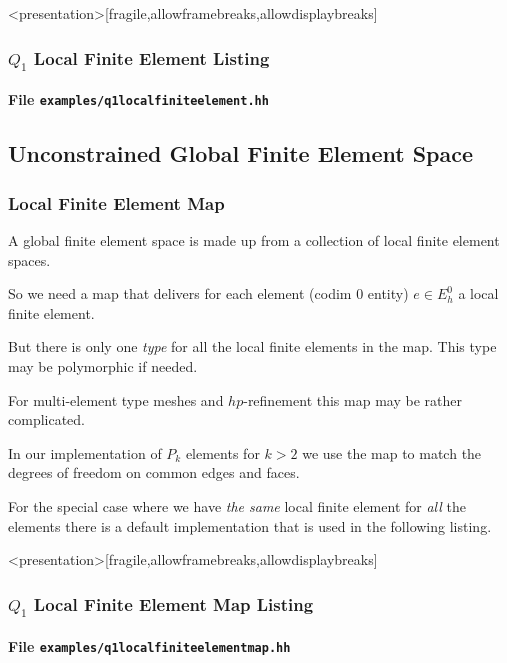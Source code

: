 \begin{frame}<presentation>[fragile,allowframebreaks,allowdisplaybreaks]
\frametitle<presentation>{$Q_1$ Local Finite Element Listing}
\framesubtitle<presentation>{File \texttt{examples/q1localfiniteelement.hh}}

\end{frame}


\subsection{Unconstrained Global Finite Element Space}

\begin{frame}
\frametitle<presentation>{Local Finite Element Map}
A global finite element space is made up from a collection of local
finite element spaces. 

So we need a map that delivers for each element (codim 0 entity) $e\in E_h^0$ a
local finite element.

But there is only one \textit{type} for all the local finite elements in the map.
This type may be polymorphic if needed.

For multi-element type meshes and $hp$-refinement this map may be
rather complicated.

In our implementation of $P_k$ elements for $k>2$ we use the map to
match the degrees of freedom on common edges and faces.

For the special case where we have \textit{the same} local finite
element for \textit{all} the elements there is a default implementation that is
used in the following listing.
\end{frame}

\begin{frame}<presentation>[fragile,allowframebreaks,allowdisplaybreaks]
\frametitle<presentation>{$Q_1$ Local Finite Element Map Listing}
\framesubtitle<presentation>{File \texttt{examples/q1localfiniteelementmap.hh}}

\end{frame}


